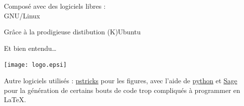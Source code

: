 \newpage
\LARGE
\thispagestyle{empty}
\vbox\bgroup
\begin{center}
Composé avec des logiciels libres :\\
GNU/Linux

\par

\bigskip

Grâce à la prodigieuse distibution (K)Ubuntu\\

\bigskip


\par

\bigskip
 
Et bien entendu\ldots

\bigskip

\texttt{[image: logo.epsi]}

\end{center}

\normalsize

\vfill
\noindent
Autre logiciels utilisés : \href{http://fr.wikipedia.org/wiki/PSTricks}{pstricks} pour les figures, avec l'aide de \href{http://fr.wikipedia.org/wiki/Python_(langage)}{python} et \href{http://fr.wikipedia.org/wiki/SAGE_(logiciel_de_calcul_formel)}{Sage} pour la génération de certains bouts de code trop compliqués à programmer en \LaTeX.

\egroup

\normalsize


